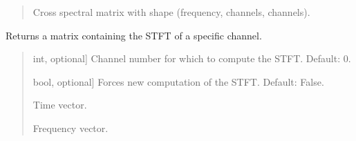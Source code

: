\documentclass[letterpaper,10pt,english]{sphinxmanual}
\begin{document}
\begin{fulllineitems}
\begin{fulllineitems}
\begin{quote}
\begin{description}
\begin{description}
\sphinxlineitem{\sphinxstylestrong{csm}}{[}\sphinxtitleref{np.ndarray}{]}
\sphinxAtStartPar
Cross spectral matrix with shape (frequency, channels, channels).

\end{description}

\end{description}\end{quote}

\end{fulllineitems}


\begin{fulllineitems}
\label{\detokenize{classes:dsptoolbox.classes.signal_class.Signal.get_spectrogram}}
\pysigstartsignatures
{}
\pysigstopsignatures
\sphinxAtStartPar
Returns a matrix containing the STFT of a specific channel.
\begin{quote}\begin{description}
\begin{description}
\sphinxlineitem{\sphinxstylestrong{channel\_number}}{[}int, optional{]}
\sphinxAtStartPar
Channel number for which to compute the STFT. Default: 0.

\sphinxlineitem{\sphinxstylestrong{force\_computation}}{[}bool, optional{]}
\sphinxAtStartPar
Forces new computation of the STFT. Default: False.

\end{description}

\begin{description}
\sphinxlineitem{\sphinxstylestrong{t\_s}}{[}\sphinxtitleref{np.ndarray}{]}
\sphinxAtStartPar
Time vector.

\sphinxlineitem{\sphinxstylestrong{f\_hz}}{[}\sphinxtitleref{np.ndarray}{]}
\sphinxAtStartPar
Frequency vector.


\end{description}
\end{description}
\end{quote}
\end{fulllineitems}
\end{fulllineitems}
\end{document}
